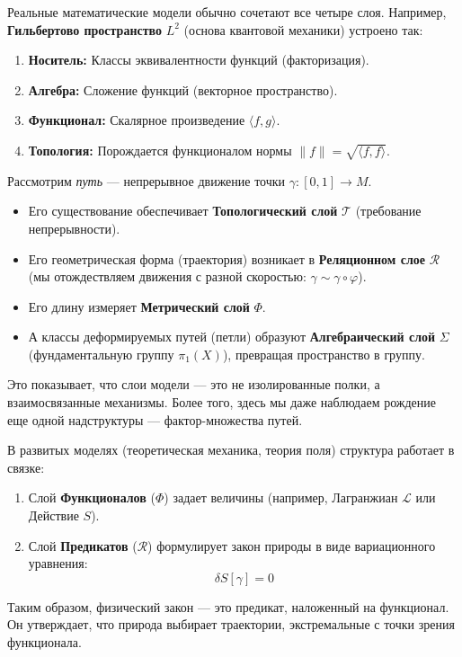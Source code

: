 \documentclass[11pt, a4paper]{extarticle}
\begin{document}
\begin{remark}
Реальные математические модели обычно сочетают все четыре слоя.
Например, \textbf{Гильбертово пространство} $L^2$ (основа квантовой механики) устроено так:
\begin{enumerate}
    \item \textbf{Носитель:} Классы эквивалентности функций (факторизация).
    \item \textbf{Алгебра:} Сложение функций (векторное пространство).
    \item \textbf{Функционал:} Скалярное произведение $\langle f, g \rangle$.
    \item \textbf{Топология:} Порождается функционалом нормы $\|f\| = \sqrt{\langle f, f \rangle}$.
\end{enumerate}
\end{remark}

\begin{example}
Рассмотрим \textit{путь} — непрерывное движение точки $\gamma: [0,1] \to M$.
\begin{itemize}
    \item Его существование обеспечивает \textbf{Топологический слой} $\mathcal{T}$ (требование непрерывности).
    \item Его геометрическая форма (траектория) возникает в \textbf{Реляционном слое} $\mathcal{R}$ (мы отождествляем движения с разной скоростью: $\gamma \sim \gamma \circ \varphi$).
    \item Его длину измеряет \textbf{Метрический слой} $\Phi$.
    \item А классы деформируемых путей (петли) образуют \textbf{Алгебраический слой} $\Sigma$ (фундаментальную группу $\pi_1(X)$), превращая пространство в группу.
\end{itemize}
Это показывает, что слои модели — это не изолированные полки, а взаимосвязанные механизмы. Более того, здесь мы даже наблюдаем рождение еще одной надструктуры --- фактор-множества путей.
\end{example}

\begin{remark}[Связка: Функционалы + Предикаты = Вариационные принципы]
В развитых моделях (теоретическая механика, теория поля) структура работает в связке:
\begin{enumerate}
    \item Слой \textbf{Функционалов} ($\Phi$) задает величины (например, Лагранжиан $\mathcal{L}$ или Действие $S$).
    \item Слой \textbf{Предикатов} ($\mathcal{R}$) формулирует закон природы в виде вариационного уравнения:
    $$ \delta S[\gamma] = 0 $$
\end{enumerate}
Таким образом, физический закон — это предикат, наложенный на функционал. Он утверждает, что природа выбирает траектории, экстремальные с точки зрения функционала.
\end{remark}
\end{document}
